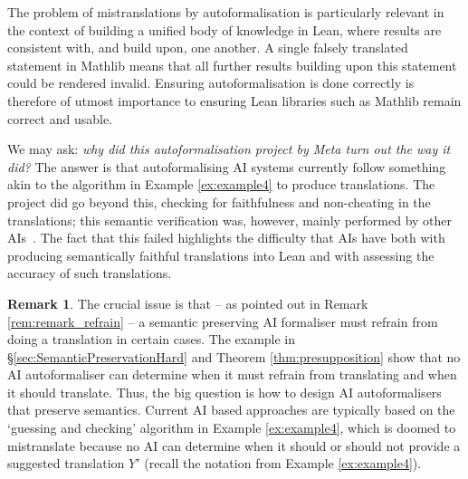 \documentclass[10pt, a4paper, reqno]{amsart}
\numberwithin{equation}{section}
\theoremstyle{definition}
\newtheorem{remark}[theorem]{Remark}
\theoremstyle{definition}
\begin{document}
The problem of mistranslations by autoformalisation is particularly relevant in the context of building a unified body of knowledge in Lean, where results are consistent with, and build upon, one another. A single falsely translated statement in Mathlib means that all further results building upon this statement could be rendered invalid. Ensuring autoformalisation is done correctly is therefore of utmost importance to ensuring Lean libraries such as Mathlib remain correct and usable. 

We may ask: \emph{why did this autoformalisation project by Meta turn out the way it did?} The answer is that autoformalising AI systems currently follow something akin to the algorithm in Example \ref{ex:example4} to produce translations. The project did go beyond this, checking for faithfulness and non-cheating in the translations;  this semantic verification was, however, mainly performed by other AIs~\cite[Section~3 and Appendix~D]{RammalEtAl2026}. The fact that this failed highlights the difficulty that AIs have both with producing semantically faithful translations into Lean and with assessing the accuracy of such translations.

\begin{remark}
The crucial issue is that -- as pointed out in Remark \ref{rem:remark_refrain} -- a semantic preserving AI formaliser must refrain from doing a translation in certain cases. The example in \S \ref{sec:SemanticPreservationHard} and Theorem \ref{thm:presupposition} show that no AI autoformaliser can determine when it must refrain from translating and when it should translate. Thus, the big question is how to design AI autoformalisers that preserve semantics. Current AI based approaches are typically based on the `guessing and checking'  algorithm in Example \ref{ex:example4}, which is doomed to mistranslate because no AI can determine when it should or should not provide a suggested translation $Y'$ (recall the notation from Example \ref{ex:example4}).  
\end{remark}



\end{document}
